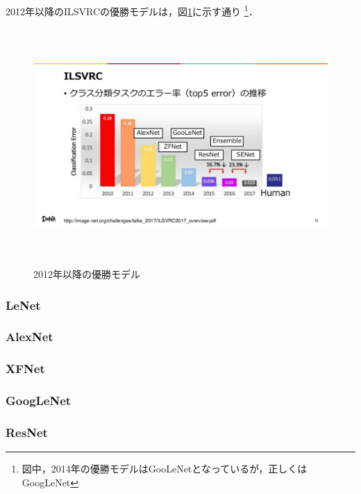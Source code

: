 \documentclass[11pt,a4paper]{jsarticle}
\begin{document}
2012年以降のILSVRCの優勝モデルは，図\ref{ilsvrc_winner_2010-2017_with_algo}に示す通り \cite{dl_hist5} \footnote{図中，2014年の優勝モデルはGooLeNetとなっているが，正しくはGoogLeNet}．

\begin{figure} [H]
	\begin{center}
		\includegraphics[clip, height=9cm, bb=-200 0 1920 1080]{data/figure/ilsvrc_winner_2010-2017_with_algo.png}
		\caption{2012年以降の優勝モデル}
		\label{ilsvrc_winner_2010-2017_with_algo}
	\end{center}
\end{figure}

\subsubsection{LeNet}

\subsubsection{AlexNet}

\subsubsection{XFNet}

\subsubsection{GoogLeNet}

\subsubsection{ResNet}
\end{document}
